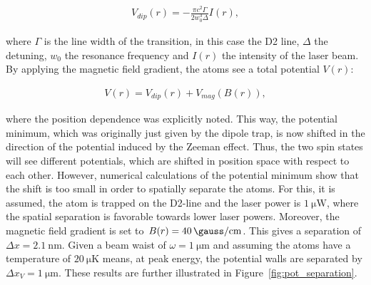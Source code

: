\begin{align}
	V_{dip}(r) = -\frac{\pi c^2 \Gamma}{2 w_0^3 \Delta} I(r),
\end{align}

where $\Gamma$ is the line width of the transition, in this case the D2 line, $\Delta$ the detuning, $w_0$ the resonance frequency and $I(r)$ the intensity of the laser beam. By applying the magnetic field gradient, the atoms see a total potential $V(r)$:

\begin{align}
	V(r) = V_{dip}(r) + V_{mag}(B(r)),
\end{align}

where the position dependence was explicitly noted. This way, the potential minimum, which was originally just given by the dipole trap, is now shifted in the direction of the potential induced by the Zeeman effect. Thus, the two spin states will see different potentials, which are shifted in position space with respect to each other. However, numerical calculations of the potential minimum show that the shift is too small in order to spatially separate the atoms. For this, it is assumed, the atom is trapped on the D2-line and the laser power is $\SI{1}{\micro\watt}$, where the spatial separation is favorable towards lower laser powers. Moreover, the magnetic field gradient is set to $B(r) = \SI{40}{\gauss\per\centi\meter}$. This gives a separation of $\Delta x = \SI{2.1}{\nano\meter}$. Given a beam waist of $\omega=\SI{1}{\micro\meter}$ and assuming the atoms have a temperature of $\SI{20}{\micro\kelvin}$ means, at peak energy, the potential walls are separated by $\Delta x_V = \SI{1}{\micro\meter}$.
These results are further illustrated in Figure~\ref{fig:pot_separation}.

\begin{figure}[t]%
\end{figure}


